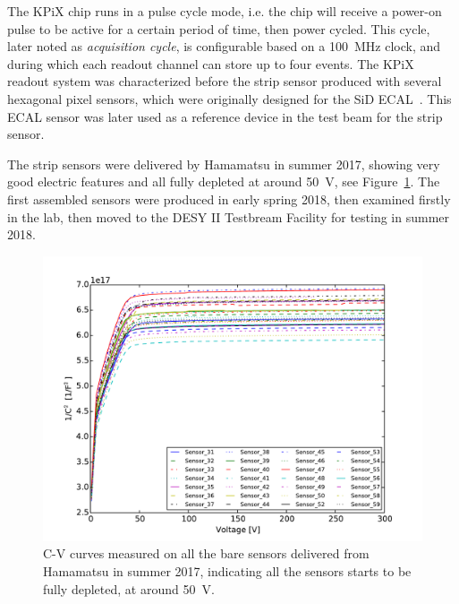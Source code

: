 \documentclass[journal]{IEEEtran}
\begin{document}
The KPiX chip runs in a pulse cycle mode, i.e. the chip will receive a power-on pulse to be active for a certain period of time, then power cycled.
This cycle, later noted as \textit{acquisition cycle}, is configurable based on a \SI{100}{MHz} clock, and during which each readout channel can store up to four events.
The KPiX readout system was characterized before the strip sensor produced with several hexagonal pixel sensors, which were originally designed for the SiD ECAL~\cite{Behnke:2013lya}.
This ECAL sensor was later used as a reference device in the test beam for the strip sensor.

The strip sensors were delivered by Hamamatsu in summer 2017, showing very good electric features and all fully depleted at around \SI{50}{\volt}, see Figure~\ref{fig:2}.
The first assembled sensors were produced in early spring 2018, then examined firstly in the lab, then moved to the DESY II Testbream Facility for testing in summer 2018.

\begin{figure}[!ht]%
  \centering
  \includegraphics[width=1.0\linewidth]{pics/All_sensors_CV.pdf}
  \caption{C-V curves measured on all the bare sensors delivered from Hamamatsu in summer 2017, indicating all the sensors starts to be fully depleted, at around \SI{50}{\volt}.}%
\label{fig:2}%
\end{figure}
\end{document}
